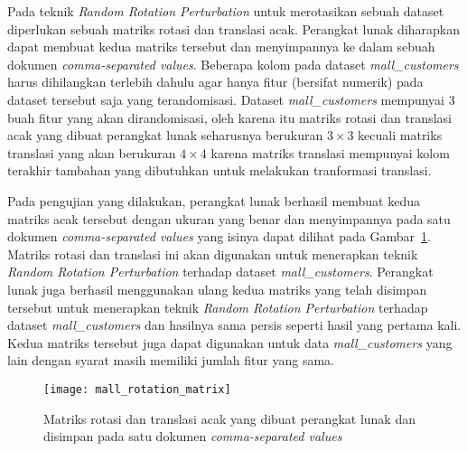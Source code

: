 Pada teknik \textit{Random Rotation Perturbation} untuk merotasikan sebuah dataset diperlukan sebuah matriks rotasi dan translasi acak. Perangkat lunak diharapkan dapat membuat kedua matriks tersebut dan menyimpannya ke dalam sebuah dokumen \textit{comma-separated values}. Beberapa kolom pada dataset \textit{mall\_customers} harus dihilangkan terlebih dahulu agar hanya fitur (bersifat numerik) pada dataset tersebut saja yang terandomisasi. Dataset \textit{mall\_customers} mempunyai 3 buah fitur yang akan dirandomisasi, oleh karena itu matriks rotasi dan translasi acak yang dibuat perangkat lunak seharusnya berukuran \(3\times3\) kecuali matriks translasi yang akan berukuran \(4\times4\) karena matriks translasi mempunyai kolom terakhir tambahan yang dibutuhkan untuk melakukan tranformasi translasi. 

Pada pengujian yang dilakukan, perangkat lunak berhasil membuat kedua matriks acak tersebut dengan ukuran yang benar dan menyimpannya pada satu dokumen \textit{comma-separated values} yang isinya dapat dilihat pada Gambar~\ref{fig:mall_rotation_matrix}. Matriks rotasi dan translasi ini akan digunakan untuk menerapkan teknik \textit{Random Rotation Perturbation} terhadap dataset \textit{mall\_customers}. Perangkat lunak juga berhasil menggunakan ulang kedua matriks yang telah disimpan tersebut untuk menerapkan teknik \textit{Random Rotation Perturbation} terhadap dataset \textit{mall\_customers} dan hasilnya sama persis seperti hasil yang pertama kali. Kedua matriks tersebut juga dapat digunakan untuk data \textit{mall\_customers} yang lain dengan syarat masih memiliki jumlah fitur yang sama.

\begin{figure}
	\centering
	\texttt{[image: mall\_rotation\_matrix]}
	\caption{Matriks rotasi dan translasi acak yang dibuat perangkat lunak dan disimpan pada satu dokumen  \textit{comma-separated values}}
	\label{fig:mall_rotation_matrix}
\end{figure}

